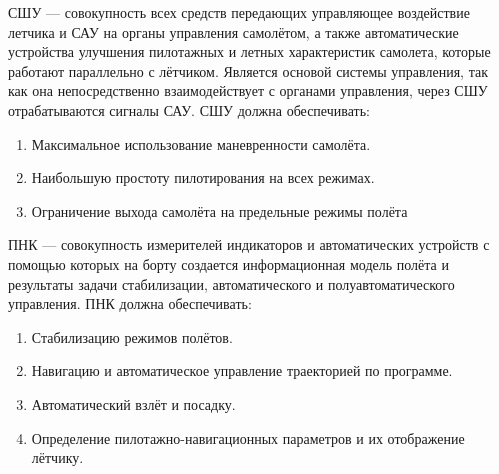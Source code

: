 \documentclass{article}
\begin{document}
\begin{figure}[ht]
\end{figure}
СШУ --- совокупность всех средств передающих управляющее воздействие летчика и
САУ на органы управления самолётом, а также автоматические устройства улучшения
пилотажных и летных характеристик самолета, которые работают параллельно с
лётчиком. Является основой системы управления, так как она непосредственно
взаимодействует с органами управления, через СШУ отрабатываются сигналы САУ.
СШУ должна обеспечивать: \begin{enumerate}
	\item Максимальное использование маневренности самолёта.
	\item Наибольшую простоту пилотирования на всех режимах.
	\item Ограничение выхода самолёта на предельные режимы полёта
\end{enumerate}
ПНК --- совокупность измерителей индикаторов и автоматических устройств с
помощью которых на борту создается информационная модель полёта и результаты
задачи стабилизации, автоматического и полуавтоматического управления. ПНК
должна обеспечивать: \begin{enumerate}
	\item Стабилизацию режимов полётов.
	\item Навигацию и автоматическое управление траекторией по программе.
	\item Автоматический взлёт и посадку.
	\item Определение пилотажно-навигационных параметров и их отображение
	      лётчику.
\end{enumerate}
\end{document}
